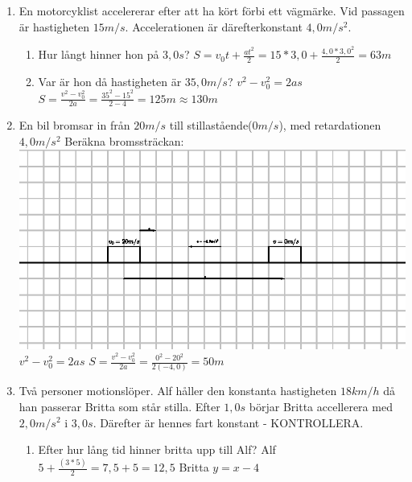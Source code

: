 \documentclass[a4paper,11pt]{article}
\begin{document}
\begin{flushleft}
\begin{enumerate}
  \item En motorcyklist accelererar efter att ha kört förbi ett vägmärke. Vid passagen är hastigheten $15m/s$.\newline
  Accelerationen är därefterkonstant $4,0m/s^2$.\newline
  \begin{enumerate}
    \item Hur långt hinner hon på $3,0s$?\newline
    $ S = v_0t+\frac{at^2}{2} = 15*3,0+\frac{4,0*3,0^2}{2} = 63m $
    \item Var är hon då hastigheten är $35,0m/s$?\newline
    $ v^2-v_0^2 = 2as $\newline
    $ S = \frac{v^2-v_0^2}{2a} = \frac{35^2-15^2}{2-4} = 125m \approx 130m $
  \end{enumerate}
  \item En bil bromsar in från $20m/s$ till stillastående($0m/s$), med retardationen $4,0m/s^2$\newline
  Beräkna bromssträckan:\newline
  \includegraphics{broms.eps}\newline
  $ v^2-v_0^2 = 2as $\newline
  $ S = \frac{v^2-v_0^2}{2a} = \frac{0^2-20^2}{2(-4,0)} = 50m $
  \item Två personer motionslöper. Alf håller den konstanta hastigheten $18km/h$ då han passerar Britta som står stilla. Efter $1,0s$ börjar Britta accellerera med $2,0m/s^2$ i $3,0s$. Därefter är hennes fart konstant - KONTROLLERA.
  \begin{enumerate}
    \item Efter hur lång tid hinner britta upp till Alf?\newline
    Alf $ 5+\frac{(3*5)}{2} = 7,5+5 = 12,5 $\newline
    Britta $ y = x-4 $
    

\end{enumerate}
\end{enumerate}
\end{flushleft}
\end{document}
